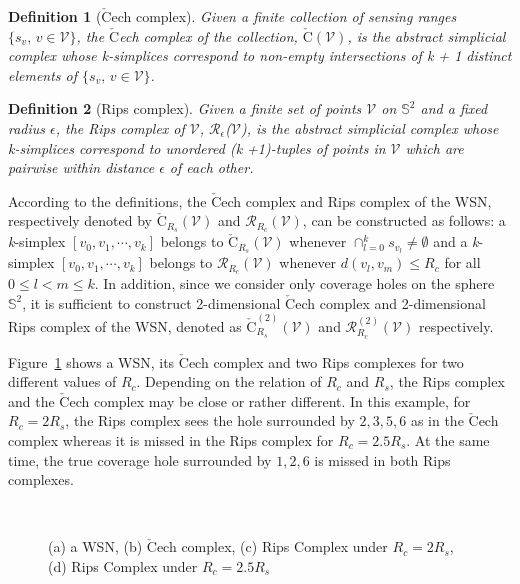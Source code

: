 \documentclass[journal, twoside]{IEEEtran}
\newtheorem{definition}{Definition}
\begin{document}
\begin{definition}[$\check{\textrm{C}}$ech complex] 
Given a finite collection of sensing ranges $\{s_v,\, v\in \mathcal{V}\}$,
the $\check{\textrm{C}}$ech complex of the collection, $\check{\textrm{C}}(\mathcal{V})$, 
is the abstract simplicial complex whose \textit{k}-simplices correspond to non-empty
intersections of k + \emph{1} distinct elements of $\{s_v,\, v\in \mathcal{V}\}$.
\end{definition}

\begin{definition} [Rips complex]
Given a finite set of points $\mathcal{V}$ on 
$\mathbb{S}^2$ and a fixed radius $\epsilon$, the Rips complex of $\mathcal{V}$,
$\mathcal{R}_\epsilon$($\mathcal{V}$), is the abstract simplicial complex
whose \textit{k}-simplices correspond to unordered \emph{(\textit{k} +1)}-tuples of 
points in $\mathcal{V}$ which are pairwise within distance $\epsilon$ of each other.
\end{definition}

According to the definitions, the
$\check{\textrm{C}}$ech complex and Rips complex of the WSN, respectively denoted by $\check{\textrm{C}}_{R_s}
(\mathcal{V})$ and $\mathcal{R}_{R_c}(\mathcal{V})$, can be
constructed as follows: a \textit{k}-simplex $[v_0, v_1,\cdots,v_k]$ belongs to $\check{\textrm{C}}_{R_s}
(\mathcal{V})$ whenever $\cap_{l=0}^k s_{v_l}\not =
\emptyset$ and a \textit{k}-simplex $[v_0, v_1,\cdots,v_k]$ belongs to
$\mathcal{R}_{R_c}(\mathcal{V})$ whenever $d(v_l, v_m)\le R_c$ for all
$ 0\le l<m\le k$. In addition, since we consider only coverage holes on 
the sphere $\mathbb{S}^2$, it is sufficient to construct 
2-dimensional $\check{\textrm{C}}$ech complex and 2-dimensional Rips complex of the WSN,
denoted as $\check{\textrm{C}}_{R_s}^{(2)}(\mathcal{V})$ and $\mathcal{R}_{R_c}^{(2)}(\mathcal{V})$
respectively.

Figure~\ref{example} shows a WSN, its $\check{\textrm{C}}$ech complex and
two Rips complexes for two different values of $R_c$. Depending on the
relation of $R_c$ and $R_s$, the Rips complex and the $\check{\textrm{C}}$ech
complex may be close or rather different. In this example, for
$R_c=2R_s$, the Rips complex sees the hole surrounded by ${2,3,5,6}$
as in the $\check{\textrm{C}}$ech complex whereas it is missed in the
Rips complex for $R_c=2.5R_s$. At the same time, the true coverage
hole surrounded by ${1,2,6}$ is missed in both Rips complexes.

\begin{figure}[ht]
  \centering {}
  \hspace{4pt}
  \\
  \hspace{4pt}
  \caption{(a) a WSN, (b) $\check{\textrm{C}}$ech complex, (c) Rips
    Complex under $R_c = 2 R_s$, (d) Rips Complex under $R_c = 2.5
    R_s$}
  \label{example}
\end{figure}
\end{document}
